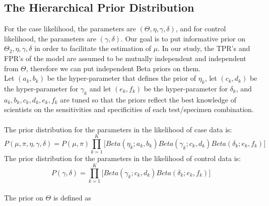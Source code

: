 \documentclass[11 pt, a4paper]{article}  %
\begin{document}
\subsection{The Hierarchical Prior Distribution}
For the case likelihood, the parameters are $(\Theta, \eta, \gamma, \delta)$, and for control likelihood, the parameters are $(\gamma, \delta)$. Our goal is to put informative prior on $\Theta_2, \eta, \gamma, \delta$ in order to facilitate the estimation of $\mu$. In our study, the TPR's and FPR's of the model are assumed to be mutually independent and independent from $\Theta$, therefore we can put independent Beta priors on them. \\

Let $(a_k,b_k)$ be the hyper-parameter that defines the prior of $\eta_k$, let $(c_k,d_k)$ be the hyper-parameter for $\gamma_k$ and let $(e_k,f_k)$ be the hyper-parameter for $\delta_k$, and  $a_k,b_k,c_k,d_k,e_k,f_k$ are tuned so that the priors reflect the best knowledge of scientists on the sensitivities and specificities of each test/specimen combination.\\
\\
The prior distribution for the parameters in the likelihood of case data is:
\[P(\mu, \pi, \eta, \gamma, \delta) = P(\mu, \pi) \prod_{k=1}^K \Big [Beta(\eta_k; a_k,b_k) Beta(\gamma_k;c_k,d_k) Beta(\delta_k;e_k,f_k) \Big ]\]
The prior distribution for the parameters in the likelihood of control data is:
\[P( \gamma, \delta) = \prod_{k=1}^K \Big [Beta(\gamma_k; c_k,d_k ) Beta(\delta_k; e_k,f_k) \Big] \]
\\
The prior on $\Theta$ is defined as
\end{document}
